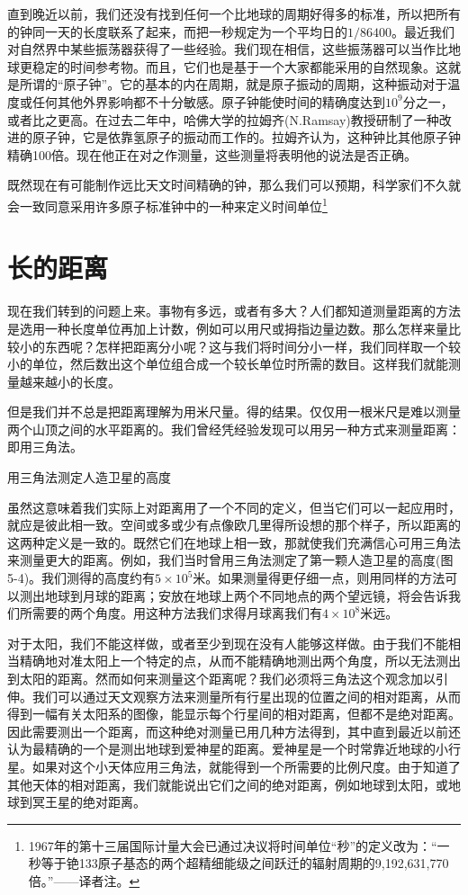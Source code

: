 \documentclass[12pt,oneside]{book}
\begin{document}
直到晚近以前，我们还没有找到任何一个比地球的周期好得多的标准，所以把所有的钟同一天的长度联系了起来，而把一秒规定为一个平均日的$  1/86400$。最近我们对自然界中某些振荡器获得了一些经验。我们现在相信，这些振荡器可以当作比地球更稳定的时间参考物。而且，它们也是基于一个大家都能采用的自然现象。这就是所谓的“原子钟”。它的基本的内在周期，就是原子振动的周期，这种振动对于温度或任何其他外界影响都不十分敏感。原子钟能使时间的精确度达到$ 10^9 $分之一，或者比之更高。在过去二年中，哈佛大学的拉姆齐(N.Ramsay)教授研制了一种改进的原子钟，它是依靠氢原子的振动而工作的。拉姆齐认为，这种钟比其他原子钟精确100倍。现在他正在对之作测量，这些测量将表明他的说法是否正确。

既然现在有可能制作远比天文时间精确的钟，那么我们可以预期，科学家们不久就会一致同意采用许多原子标准钟中的一种来定义时间单位\footnote{1967年的第十三届国际计量大会已通过决议将时间单位“秒”的定义改为：“一秒等于铯133原子基态的两个超精细能级之间跃迁的辐射周期的9,192,631,770倍。”——译者注。}



\section{长的距离}
现在我们转到的问题上来。事物有多远，或者有多大？人们都知道测量距离的方法是选用一种长度单位再加上计数，例如可以用尺或拇指边量边数。那么怎样来量比较小的东西呢？怎样把距离分小呢？这与我们将时间分小一样，我们同样取一个较小的单位，然后数出这个单位组合成一个较长单位时所需的数目。这样我们就能测量越来越小的长度。

但是我们并不总是把距离理解为用米尺量。得的结果。仅仅用一根米尺是难以测量两个山顶之间的水平距离的。我们曾经凭经验发现可以用另一种方式来测量距离：即用三角法。
\begin{fig}{用三角法测定人造卫星的高度}
\caption{用三角法测定人造卫星的高度}
\label{fig:用三角法测定人造卫星的高度}
\end{fig}
虽然这意味着我们实际上对距离用了一个不同的定义，但当它们可以一起应用时，就应是彼此相一致。空间或多或少有点像欧几里得所设想的那个样子，所以距离的这两种定义是一致的。既然它们在地球上相一致，那就使我们充满信心可用三角法来测量更大的距离。例如，我们当时曾用三角法测定了第一颗人造卫星的高度(图5-4)。我们测得的高度约有$ 5\times 10^5$米。如果测量得更仔细一点，则用同样的方法可以测出地球到月球的距离；安放在地球上两个不同地点的两个望远镜，将会告诉我们所需要的两个角度。用这种方法我们求得月球离我们有$ 4 \times 10^8 $米远。

对于太阳，我们不能这样做，或者至少到现在没有人能够这样做。由于我们不能相当精确地对准太阳上一个特定的点，从而不能精确地测出两个角度，所以无法测出到太阳的距离。然而如何来测量这个距离呢？我们必须将三角法这个观念加以引伸。我们可以通过天文观察方法来测量所有行星出现的位置之间的相对距离，从而得到一幅有关太阳系的图像，能显示每个行星间的相对距离，但都不是绝对距离。因此需要测出一个距离，而这种绝对测量已用几种方法得到，其中直到最近以前还认为最精确的一个是测出地球到爱神星的距离。爱神星是一个时常靠近地球的小行星。如果对这个小天体应用三角法，就能得到一个所需要的比例尺度。由于知道了其他天体的相对距离，我们就能说出它们之间的绝对距离，例如地球到太阳，或地球到冥王星的绝对距离。
\end{document}
